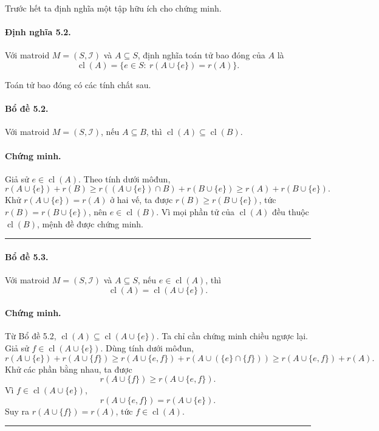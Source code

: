 \documentclass[11pt]{article}
\newcommand{\qedmark}{\hfill\rule{0.7ex}{0.7ex}}
\begin{document}
Trước hết ta định nghĩa một tập hữu ích cho chứng minh.

\paragraph{Định nghĩa 5.2.}
Với matroid \(M=(S,\mathcal I)\) và \(A\subseteq S\), định nghĩa toán tử bao đóng
của \(A\) là
\[
  \operatorname{cl}(A)=\{e\in S:\ r(A\cup\{e\})=r(A)\}.
\]

Toán tử bao đóng có các tính chất sau.

\paragraph{Bổ đề 5.2.}
Với matroid \(M=(S,\mathcal I)\), nếu \(A\subseteq B\), thì
\(\operatorname{cl}(A)\subseteq\operatorname{cl}(B)\).

\paragraph{Chứng minh.}
Giả sử \(e\in\operatorname{cl}(A)\). Theo tính dưới môđun,
\[
  r(A\cup\{e\})+r(B)\ge r((A\cup\{e\})\cap B)+r(B\cup\{e\})
  \ge r(A)+r(B\cup\{e\}).
\]
Khử \(r(A\cup\{e\})=r(A)\) ở hai vế, ta được \(r(B)\ge r(B\cup\{e\})\), tức
\(r(B)=r(B\cup\{e\})\), nên \(e\in\operatorname{cl}(B)\). Vì mọi phần tử của
\(\operatorname{cl}(A)\) đều thuộc \(\operatorname{cl}(B)\), mệnh đề được chứng
minh. \qedmark

\paragraph{Bổ đề 5.3.}
Với matroid \(M=(S,\mathcal I)\) và \(A\subseteq S\), nếu
\(e\in\operatorname{cl}(A)\), thì
\[
  \operatorname{cl}(A)=\operatorname{cl}(A\cup\{e\}).
\]

\paragraph{Chứng minh.}
Từ Bổ đề 5.2, \(\operatorname{cl}(A)\subseteq\operatorname{cl}(A\cup\{e\})\). Ta
chỉ cần chứng minh chiều ngược lại. Giả sử
\(f\in\operatorname{cl}(A\cup\{e\})\). Dùng tính dưới môđun,
\[
  r(A\cup\{e\})+r(A\cup\{f\})
  \ge r(A\cup\{e,f\})+r(A\cup(\{e\}\cap\{f\}))
  \ge r(A\cup\{e,f\})+r(A).
\]
Khử các phần bằng nhau, ta được
\[
  r(A\cup\{f\})\ge r(A\cup\{e,f\}).
\]
Vì \(f\in\operatorname{cl}(A\cup\{e\})\),
\[
  r(A\cup\{e,f\})=r(A\cup\{e\}).
\]
Suy ra \(r(A\cup\{f\})=r(A)\), tức \(f\in\operatorname{cl}(A)\). \qedmark
\end{document}
